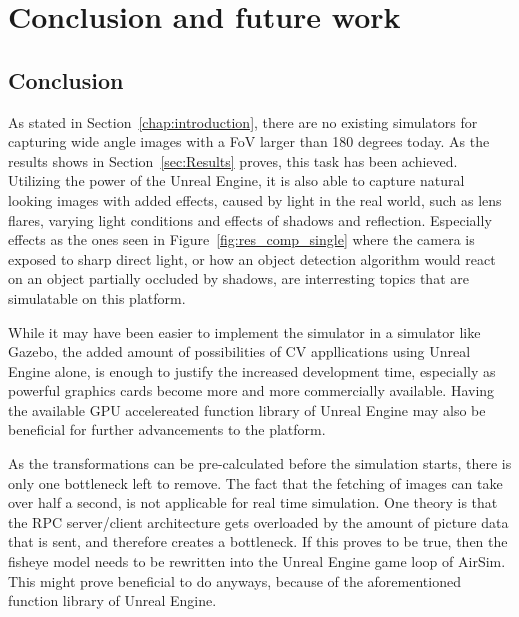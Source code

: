 
\chapter{Conclusion and future work}
\section{Conclusion}
As stated in Section~\ref{chap:introduction}, there are no existing simulators for capturing wide angle images with a FoV larger than 180 degrees today. As the results shows in Section~\ref{sec:Results} proves, this task has been achieved. Utilizing the power of the Unreal Engine, it is also able to capture natural looking images with added effects, caused by light in the real world, such as lens flares, varying light conditions and effects of shadows and reflection. Especially effects as the ones seen in Figure~\ref{fig:res_comp_single} where the camera is exposed to sharp direct light, or how an object detection algorithm would react on an object partially occluded by shadows, are interresting topics that are simulatable on this platform.

While it may have been easier to implement the simulator in a simulator like Gazebo, the added amount of possibilities of CV appllications using Unreal Engine alone, is enough to justify the increased development time, especially as powerful graphics cards become more and more commercially available. Having the available GPU accelereated function library of Unreal Engine may also be beneficial for further advancements to the platform.

As the transformations can be pre-calculated before the simulation starts, there is only one bottleneck left to remove. The fact that the fetching of images can take over half a second, is not applicable for real time simulation. One theory is that the RPC server/client architecture gets overloaded by the amount of picture data that is sent, and therefore creates a bottleneck. If this proves to be true, then the fisheye model needs to be rewritten into the Unreal Engine game loop of AirSim. This might prove beneficial to do anyways, because of the aforementioned function library of Unreal Engine.

